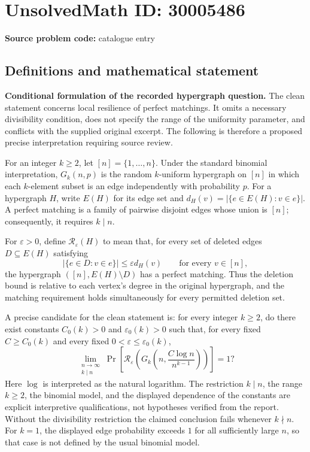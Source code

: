 \documentclass[11pt]{article}
\begin{document}
\section*{UnsolvedMath ID: 30005486}
\textbf{Source problem code:} catalogue entry
\subsection{Definitions and mathematical statement}
\textbf{Conditional formulation of the recorded hypergraph question.} The clean statement concerns local resilience of perfect matchings. It omits a necessary divisibility condition, does not specify the range of the uniformity parameter, and conflicts with the supplied original excerpt. The following is therefore a proposed precise interpretation requiring source review.

For an integer \(k\geq 2\), let \([n]=\{1,\ldots,n\}\). Under the standard binomial interpretation, \(G_k(n,p)\) is the random \(k\)-uniform hypergraph on \([n]\) in which each \(k\)-element subset is an edge independently with probability \(p\). For a hypergraph \(H\), write \(E(H)\) for its edge set and \(d_H(v)=|\{e\in E(H):v\in e\}|\). A perfect matching is a family of pairwise disjoint edges whose union is \([n]\); consequently, it requires \(k\mid n\).

For \(\varepsilon>0\), define \(\mathcal R_\varepsilon(H)\) to mean that, for every set of deleted edges \(D\subseteq E(H)\) satisfying
\[
 |\{e\in D:v\in e\}|\leq\varepsilon d_H(v)
 \qquad\text{for every }v\in[n],
\]
the hypergraph \(([n],E(H)\setminus D)\) has a perfect matching. Thus the deletion bound is relative to each vertex's degree in the original hypergraph, and the matching requirement holds simultaneously for every permitted deletion set.

A precise candidate for the clean statement is: for every integer \(k\geq2\), do there exist constants \(C_0(k)>0\) and \(\varepsilon_0(k)>0\) such that, for every fixed \(C\geq C_0(k)\) and every fixed \(0<\varepsilon\leq\varepsilon_0(k)\),
\[
 \lim_{\substack{n\to\infty\\k\mid n}}
 \Pr\!\left[
 \mathcal R_\varepsilon\!\left(
 G_k\!\left(n,\frac{C\log n}{n^{k-1}}\right)
 \right)\right]=1?
\]
Here \(\log\) is interpreted as the natural logarithm. The restriction \(k\mid n\), the range \(k\geq2\), the binomial model, and the displayed dependence of the constants are explicit interpretive qualifications, not hypotheses verified from the report. Without the divisibility restriction the claimed conclusion fails whenever \(k\nmid n\). For \(k=1\), the displayed edge probability exceeds \(1\) for all sufficiently large \(n\), so that case is not defined by the usual binomial model.
\end{document}
